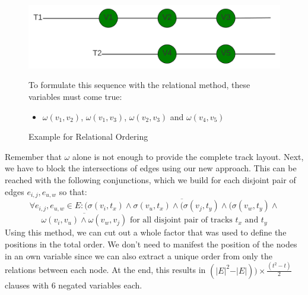 \documentclass[bachelor, english]{algothesis}
\begin{document}
\begin{figure}[ht]
  \centering
  \begin{minipage}{0.6\textwidth}
    \includegraphics[width=\linewidth]{figures/Order_example.png} 
  \caption{Example for Relational Ordering}
  \label{fig:order_example_rel}
  \end{minipage}%
  \begin{minipage}{0.4\textwidth}
    To formulate this sequence with the relational method, these variables must come true:
    \begin{itemize}
    \item  $\omega(v_1,v_2)$, $\omega(v_1,v_3)$, $\omega(v_2,v_3)$ and $\omega(v_4,v_5)$
    \end{itemize}
  \end{minipage}
\end{figure}
\noindent
\newline
\newline
Remember that $\omega$ alone is not enough to provide the complete track layout. Next, we have to block the intersections of edges using our new approach. This can be reached with the following conjunctions, which we build for each disjoint pair of edges $e_{i,j}, e_{u,w}$ so that:
    $$ \forall e_{i,j}, e_{u,w} \in E : \overline{(\sigma(v_i,t_x) \land \sigma(v_u,t_x) \land (\sigma(v_j,t_y) \land (\sigma(v_w,t_y) \land}$$ 
    $$ \overline{\omega(v_i,v_u) \land \omega(v_w,v_j)}\text{ for all disjoint pair of tracks } t_x \text{ and } t_y $$
Using this method, we can cut out a whole factor that was used to define the positions in the total order. We don't need to manifest the position of the nodes in an own variable since we can also extract a unique order from only the relations between each node. At the end, this results in 
$ (\vert E \vert^2 - \vert E \vert)) \times \frac{(t^2-t)}{2}$ clauses with 6 negated variables each.
\end{document}
